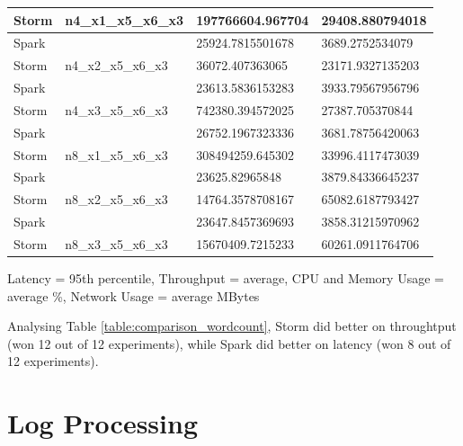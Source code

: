 \documentclass[ppgc,diss,english]{iiufrgs}
\begin{document}
\begin{table}[H]
\begin{tabular}{|l|l|l|l|}
Storm    & \multirow{-2}{*}{n4\_x1\_x5\_x6\_x3} & 197766604.967704                         & \cellcolor[HTML]{34E570}29408.880794018 \\ \hline
Spark    &                                      & \cellcolor[HTML]{34E570}25924.7815501678 & 3689.2752534079 \\ \cline{1-1} \cline{3-4} 
Storm    & \multirow{-2}{*}{n4\_x2\_x5\_x6\_x3} & 36072.407363065                          & \cellcolor[HTML]{34E570}23171.9327135203 \\ \hline
Spark    &                                      & \cellcolor[HTML]{34E570}23613.5836153283 & 3933.79567956796 \\ \cline{1-1} \cline{3-4} 
Storm    & \multirow{-2}{*}{n4\_x3\_x5\_x6\_x3} & 742380.394572025                         & \cellcolor[HTML]{34E570}27387.705370844 \\ \hline
Spark    &                                      & \cellcolor[HTML]{34E570}26752.1967323336 & 3681.78756420063 \\ \cline{1-1} \cline{3-4} 
Storm    & \multirow{-2}{*}{n8\_x1\_x5\_x6\_x3} & 308494259.645302                         & \cellcolor[HTML]{34E570}33996.4117473039 \\ \hline
Spark    &                                      & 23625.82965848                           & 3879.84336645237 \\ \cline{1-1} \cline{3-4} 
Storm    & \multirow{-2}{*}{n8\_x2\_x5\_x6\_x3} & \cellcolor[HTML]{34E570}14764.3578708167 & \cellcolor[HTML]{34E570}65082.6187793427 \\ \hline
Spark    &                                      & \cellcolor[HTML]{34E570}23647.8457369693 & 3858.31215970962 \\ \cline{1-1} \cline{3-4} 
Storm    & \multirow{-2}{*}{n8\_x3\_x5\_x6\_x3} & 15670409.7215233                         & \cellcolor[HTML]{34E570}60261.0911764706 \\ \hline
\end{tabular}
\end{table}

Latency = 95th percentile, Throughput = average, CPU and Memory Usage = average \%, Network Usage = average MBytes

Analysing Table \ref{table:comparison_wordcount}, Storm did better on throughtput (won 12 out of 12 experiments), while Spark did better on latency (won 8 out of 12 experiments).




\section{Log Processing}
\end{document}
